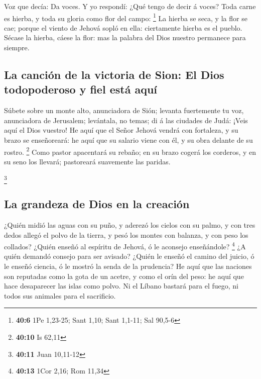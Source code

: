  Voz que decía: Da voces. Y yo respondí: ¿Qué tengo de
decir á voces? Toda carne es hierba, y toda su gloria como flor del
campo: \footnote{\textbf{40:6} 1Pe 1,23-25; Sant 1,10; Sant 1,1-11; Sal
  90,5-6}  La hierba se seca, y la flor se cae; porque el
viento de Jehová sopló en ella: ciertamente hierba es el pueblo.
 Sécase la hierba, cáese la flor: mas la palabra del Dios
nuestro permanece para siempre.

\hypertarget{la-canciuxf3n-de-la-victoria-de-sion-el-dios-todopoderoso-y-fiel-estuxe1-aquuxed}{%
\subsection{La canción de la victoria de Sion: El Dios todopoderoso y
fiel está
aquí}\label{la-canciuxf3n-de-la-victoria-de-sion-el-dios-todopoderoso-y-fiel-estuxe1-aquuxed}}

 Súbete sobre un monte alto, anunciadora de Sión; levanta
fuertemente tu voz, anunciadora de Jerusalem; levántala, no temas; di á
las ciudades de Judá: ¡Veis aquí el Dios vuestro!  He
aquí que el Señor Jehová vendrá con fortaleza, y su brazo se
enseñoreará: he aquí que su salario viene con él, y su obra delante de
su rostro. \footnote{\textbf{40:10} Is 62,11}  Como
pastor apacentará su rebaño; en su brazo cogerá los corderos, y en su
seno los llevará; pastoreará suavemente las paridas.

\footnote{\textbf{40:11} Juan 10,11-12}

\hypertarget{la-grandeza-de-dios-en-la-creaciuxf3n}{%
\subsection{La grandeza de Dios en la
creación}\label{la-grandeza-de-dios-en-la-creaciuxf3n}}

 ¿Quién midió las aguas con su puño, y aderezó los cielos
con su palmo, y con tres dedos allegó el polvo de la tierra, y pesó los
montes con balanza, y con peso los collados?  ¿Quién
enseñó al espíritu de Jehová, ó le aconsejo enseñándole? \footnote{\textbf{40:13}
  1Cor 2,16; Rom 11,34}  ¿A quién demandó consejo para
ser avisado? ¿Quién le enseñó el camino del juicio, ó le enseñó ciencia,
ó le mostró la senda de la prudencia?  He aquí que las
naciones son reputadas como la gota de un acetre, y como el orín del
peso: he aquí que hace desaparecer las islas como polvo. 
Ni el Líbano bastará para el fuego, ni todos sus animales para el
sacrificio.

